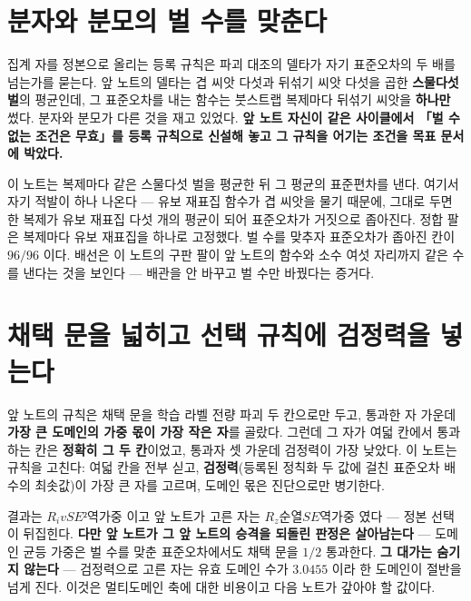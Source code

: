 \section{분자와 분모의 벌 수를 맞춘다}


집계 자를 정본으로 올리는 등록 규칙은 파괴 대조의 델타가 자기 표준오차의 두 배를 넘는가를 묻는다. 앞 노트의 델타는 겹 씨앗 다섯과 뒤섞기 씨앗 다섯을 곱한 \textbf{스물다섯 벌}의 평균인데, 그 표준오차를 내는 함수는 붓스트랩 복제마다 뒤섞기 씨앗을 \textbf{하나만} 썼다. 분자와 분모가 다른 것을 재고 있었다. \textbf{앞 노트 자신이 같은 사이클에서 「벌 수 없는 조건은 무효」를 등록 규칙으로 신설해 놓고 그 규칙을 어기는 조건을 목표 문서에 박았다.}

이 노트는 복제마다 같은 스물다섯 벌을 평균한 뒤 그 평균의 표준편차를 낸다. 여기서 자기 적발이 하나 나온다 --- 유보 재표집 함수가 겹 씨앗을 물기 때문에, 그대로 두면 한 복제가 유보 재표집 다섯 개의 평균이 되어 표준오차가 거짓으로 좁아진다. 정합 팔은 복제마다 유보 재표집을 하나로 고정했다. 벌 수를 맞추자 표준오차가 좁아진 칸이 $96 / 96$ 이다. 배선은 이 노트의 구판 팔이 앞 노트의 함수와 소수 여섯 자리까지 같은 수를 낸다는 것을 보인다 --- 배관을 안 바꾸고 벌 수만 바꿨다는 증거다.

\section{채택 문을 넓히고 선택 규칙에 검정력을 넣는다}


앞 노트의 규칙은 채택 문을 학습 라벨 전량 파괴 두 칸으로만 두고, 통과한 자 가운데 \textbf{가장 큰 도메인의 가중 몫이 가장 작은 자}를 골랐다. 그런데 그 자가 여덟 칸에서 통과하는 칸은 \textbf{정확히 그 두 칸}이었고, 통과자 셋 가운데 검정력이 가장 낮았다. 이 노트는 규칙을 고친다: 여덟 칸을 전부 싣고, \textbf{검정력}(등록된 정칙화 두 값에 걸친 표준오차 배수의 최솟값)이 가장 큰 자를 고르며, 도메인 몫은 진단으로만 병기한다.

결과는 $R_iv SE² 역가중$ 이고 앞 노트가 고른 자는 $R_z 순열SE 역가중$ 였다 --- 정본 선택이 뒤집힌다. \textbf{다만 앞 노트가 그 앞 노트의 승격을 되돌린 판정은 살아남는다} --- 도메인 균등 가중은 벌 수를 맞춘 표준오차에서도 채택 문을 $1 / 2$ 통과한다. \textbf{그 대가는 숨기지 않는다} --- 검정력으로 고른 자는 유효 도메인 수가 $3.0455$ 이라 한 도메인이 절반을 넘게 진다. 이것은 멀티도메인 축에 대한 비용이고 다음 노트가 갚아야 할 값이다.

